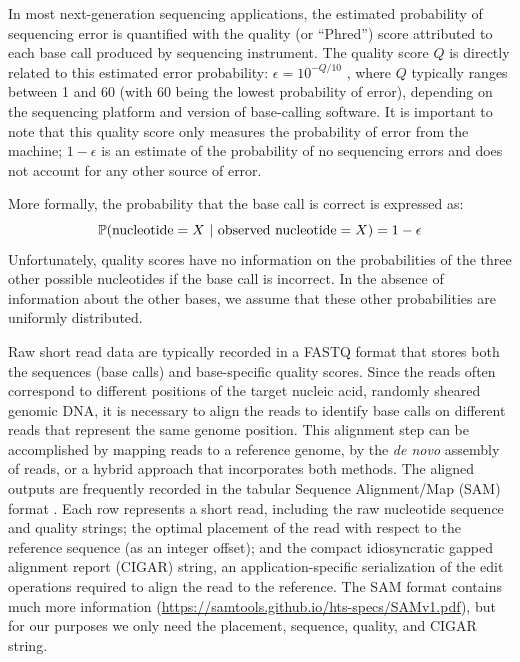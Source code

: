 \documentclass[10pt]{article}
\begin{document}
In most next-generation sequencing applications, the estimated probability of sequencing error is quantified with the quality (or ``Phred'') score attributed to each base call produced by sequencing instrument.
The quality score $Q$ is directly related to this estimated error probability: $\epsilon = 10^{-Q/10}$ \citep{ewingBaseCallingAutomatedSequencer1998}, where $Q$ typically ranges between 1 and 60 (with 60 being the lowest probability of error), depending on the sequencing platform and version of base-calling software.
It is important to note that this quality score only measures the probability of error from the machine; $1 - \epsilon$ is an estimate of the probability of no sequencing errors and does not account for any other source of error.

More formally, the probability that the base call is correct is expressed as: 
\begin{equation}
\label{eq:basecall}
\mathbb{P}(\text{nucleotide}=X \,\,|\,\, \text{observed nucleotide} = X) = 1 - \epsilon
\end{equation}
Unfortunately, quality scores have no information on the probabilities of the three other possible nucleotides if the base call is incorrect.
In the absence of information about the other bases, we assume that these other probabilities are uniformly distributed.


Raw short read data are typically recorded in a FASTQ format that stores both the sequences (base calls) and base-specific quality scores.
Since the reads often correspond to different positions of the target nucleic acid, \eg randomly sheared genomic DNA, it is necessary to align the reads to identify base calls on different reads that represent the same genome position.
This alignment step can be accomplished by mapping reads to a reference genome, by the \emph{de novo} assembly of reads, or a hybrid approach that incorporates both methods.
The aligned outputs are frequently recorded in the tabular Sequence Alignment/Map (SAM) format \citep{liSequenceAlignmentMap2009}.
Each row represents a short read, including the raw nucleotide sequence and quality strings; the optimal placement of the read with respect to the reference sequence (as an integer offset); and the compact idiosyncratic gapped alignment report (CIGAR) string, an application-specific serialization of the edit operations required to align the read to the reference.
The SAM format contains much more information (\url{https://samtools.github.io/hts-specs/SAMv1.pdf}), but for our purposes we only need the placement, sequence, quality, and CIGAR string.
\end{document}
